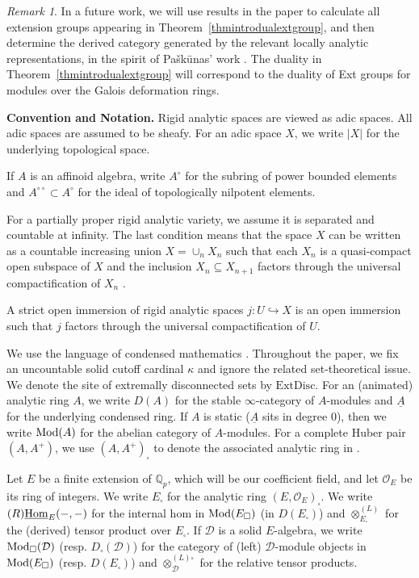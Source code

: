 \documentclass[a4paper,10pt]{amsart}
\theoremstyle{remark}
\newtheorem{remark}[theorem]{Remark}
\theoremstyle{definition}
\theoremstyle{plain}
\numberwithin{equation}{section}
\newcommand{\bbQ}{{\mathbb Q}}
\newcommand{\calD}{{\mathcal D}}
\newcommand{\calO}{{\mathcal O}}
\newcommand{\Hom}{{\rm Hom}}
\newcommand{\uHom}{\underline{\Hom}}
\newcommand{\Mod}{{\rm Mod}}
\begin{document}
\begin{remark}
	In a future work, we will use results in the paper to calculate all extension groups appearing in Theorem~\ref{thmintrodualextgroup}, and then determine the derived category generated by the relevant locally analytic representations, in the spirit of Pa{\v{s}}k{\=u}nas' work \cite{pavskunas2013image}. The duality in Theorem~\ref{thmintrodualextgroup} will correspond to the duality of Ext groups for modules over the Galois deformation rings.
\end{remark}

\noindent\textbf{Convention and Notation.} Rigid analytic spaces are viewed as adic spaces. All adic spaces are assumed to be sheafy. For an adic space $X$, we write $|X|$ for the underlying topological space.

If $A$ is an affinoid algebra, write $A^{\circ}$ for the subring of power bounded elements and $A^{\circ\circ}\subset A^{\circ}$ for the ideal of topologically nilpotent elements.

For a partially proper rigid analytic variety, we assume it is separated and countable at infinity. The last condition means that the space $X$ can be written as a countable increasing union $X=\cup_n X_n$ such that each $X_n$ is a quasi-compact open subspace of $X$ and the inclusion $X_n\subseteq X_{n+1}$ factors through the universal compactification of $X_n$ \cite[Def.~5.1.1]{huber1996etale}.

A strict open immersion of rigid analytic spaces $j:U\hookrightarrow X$ is an open immersion such that $j$ factors through the universal compactification of $U$.

We use the language of condensed mathematics \cite{scholze2019condensed}. Throughout the paper, we fix an uncountable solid cutoff
cardinal $\kappa$ \cite[Def.~2.9.11]{mann2022p} and ignore the related set-theoretical issue. We denote the site of  extremally disconnected sets by $\mathrm{ExtDisc}$. For an (animated) analytic ring $A$, we write $D(A)$ for the stable $\infty$-category of $A$-modules and $\underline{A}$ for the underlying condensed ring. If $A$ is static ($\underline{A}$ sits in degree $0$), then we write $\Mod(A)$ for the abelian category of $A$-modules. For a complete Huber pair $(A,A^+)$, we use $(A,A^+)_{\square}$ to denote the associated analytic ring in \cite[\S~3]{andreychev2021pseudocoherent}.  

Let $E$ be a finite extension of $\bbQ_p$, which will be our coefficient field, and let $\calO_E$ be its ring of integers. We write $E_{\square}$ for the analytic ring $(E,\calO_E)_{\square}$. We write $(R)\uHom_{E}(-,-)$ for the internal hom in $\Mod(E_{\square})$ (in $D(E_{\square})$) and $\otimes_{E_{\square}}^{(L)}$ for the (derived) tensor product over $E_{\square}$. If $\calD$ is a solid $E$-algebra, we write $\Mod_{\square}(\calD)$ (resp. $ D_{\square}(\calD)$) for the category of (left) $\calD$-module objects in $\Mod(E_{\square})$ (resp. $D(E_{\square})$) and $\otimes_{\calD}^{(L)\square}$ for the relative tensor products.
\end{document}
